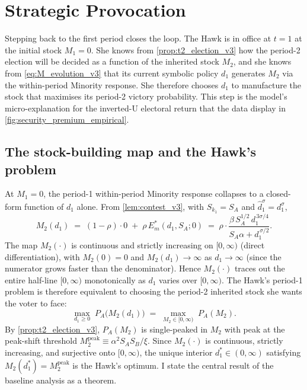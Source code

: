 \documentclass[11pt,twoside]{extarticle}
\begin{document}
\section{Strategic Provocation}\label{sec:block3}

Stepping back to the first period closes the loop. The Hawk is in office at $t=1$ at the initial stock $M_1=0$. She knows from \autoref{prop:t2_election_v3} how the period-2 election will be decided as a function of the inherited stock $M_2$, and she knows from \autoref{eq:M_evolution_v3} that its current symbolic policy $d_1$ generates $M_2$ via the within-period Minority response. She therefore chooses $d_1$ to manufacture the stock that maximises its period-2 victory probability. This step is the model's micro-explanation for the inverted-U electoral return that the data display in \autoref{fig:security_premium_empirical}.

\subsection{The stock-building map and the Hawk's problem}\label{subsec:sowing_v3}

At $M_1=0$, the period-1 within-period Minority response collapses to a closed-form function of $d_1$ alone. From \autoref{lem:contest_v3}, with $S_{k_1}=S_A$ and $\hat d_1^\sigma=d_1^\sigma$,
\begin{equation}\label{eq:M2_of_d1_v3}
    M_2(d_1)\;=\;(1-\rho)\cdot 0\;+\;\rho\,E_m^*(d_1,S_A;0)\;=\;\rho\cdot\frac{\beta\,S_A^{1/2}\,d_1^{\,3\sigma/4}}{S_A\alpha+d_1^{\,\sigma/2}}.
\end{equation}
The map $M_2(\cdot)$ is continuous and strictly increasing on $[0,\infty)$ (direct differentiation), with $M_2(0)=0$ and $M_2(d_1)\to\infty$ as $d_1\to\infty$ (since the numerator grows faster than the denominator). Hence $M_2(\cdot)$ traces out the entire half-line $[0,\infty)$ monotonically as $d_1$ varies over $[0,\infty)$. The Hawk's period-1 problem is therefore equivalent to choosing the period-2 inherited stock she wants the voter to face:
\begin{equation}\label{eq:hawk_t1_problem_v3}
    \max_{d_1\ge 0}\;P_A\big(M_2(d_1)\big)\;=\;\max_{M_2\in[0,\infty)}\;P_A(M_2).
\end{equation}
By \autoref{prop:t2_election_v3}, $P_A(M_2)$ is single-peaked in $M_2$ with peak at the peak-shift threshold $M_2^{\mathrm{peak}}\equiv\alpha^2 S_A S_B/\xi$. Since $M_2(\cdot)$ is continuous, strictly increasing, and surjective onto $[0,\infty)$, the unique interior $d_1^*\in(0,\infty)$ satisfying $M_2(d_1^*)=M_2^{\mathrm{peak}}$ is the Hawk's optimum. I state the central result of the baseline analysis as a theorem.
\end{document}
